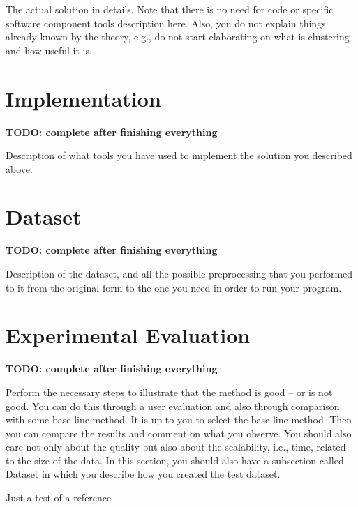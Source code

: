 The actual solution in details. Note that there is no need for code or specific software component tools description here. Also, you do not explain things already known by the theory, e.g., do not start elaborating on what is clustering and how useful it is.


\section{Implementation}

\begin{center}
  \textbf{TODO: complete after finishing everything}
\end{center}

Description of what tools you have used to implement the solution you described above.


\section{Dataset}

\begin{center}
  \textbf{TODO: complete after finishing everything}
\end{center}

Description of the dataset, and all the possible preprocessing that you performed to it from the original form to the one you need in order to run your program.


\section{Experimental Evaluation}

\begin{center}
  \textbf{TODO: complete after finishing everything}
\end{center}

Perform the necessary steps to illustrate that the method is good – or is not good. You can do this through a user evaluation and also through comparison with some base line method. It is up to you to select the base line method. Then you can compare the results and comment on what you observe. You should also care not only about the quality but also about the scalability, i.e., time, related to the size of the data. In this section, you should also have a subsection called Dataset in which you describe how you created the test dataset.

Just a test of a reference \cite{Poker06}
